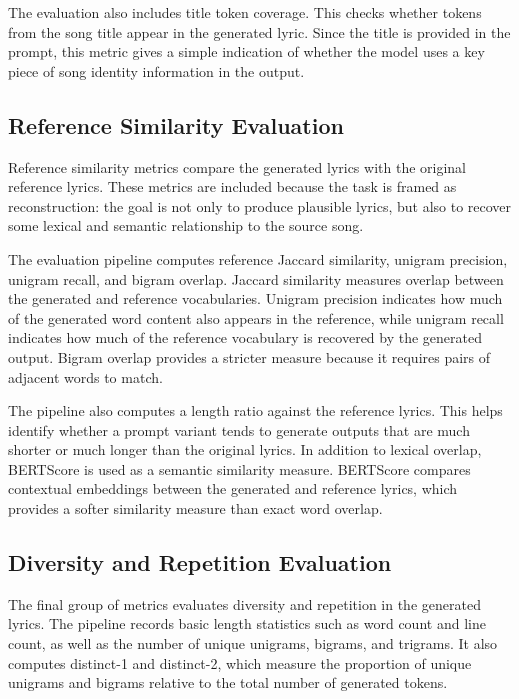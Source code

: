 The evaluation also includes title token coverage. This checks whether tokens from the song title appear in the generated lyric. Since the title is provided in the prompt, this metric gives a simple indication of whether the model uses a key piece of song identity information in the output.

\subsection{Reference Similarity Evaluation}

Reference similarity metrics compare the generated lyrics with the original reference lyrics. These metrics are included because the task is framed as reconstruction: the goal is not only to produce plausible lyrics, but also to recover some lexical and semantic relationship to the source song.

The evaluation pipeline computes reference Jaccard similarity, unigram precision, unigram recall, and bigram overlap. Jaccard similarity measures overlap between the generated and reference vocabularies. Unigram precision indicates how much of the generated word content also appears in the reference, while unigram recall indicates how much of the reference vocabulary is recovered by the generated output. Bigram overlap provides a stricter measure because it requires pairs of adjacent words to match.

The pipeline also computes a length ratio against the reference lyrics. This helps identify whether a prompt variant tends to generate outputs that are much shorter or much longer than the original lyrics. In addition to lexical overlap, BERTScore is used as a semantic similarity measure. BERTScore compares contextual embeddings between the generated and reference lyrics, which provides a softer similarity measure than exact word overlap.

\subsection{Diversity and Repetition Evaluation}

The final group of metrics evaluates diversity and repetition in the generated lyrics. The pipeline records basic length statistics such as word count and line count, as well as the number of unique unigrams, bigrams, and trigrams. It also computes distinct-1 and distinct-2, which measure the proportion of unique unigrams and bigrams relative to the total number of generated tokens.

